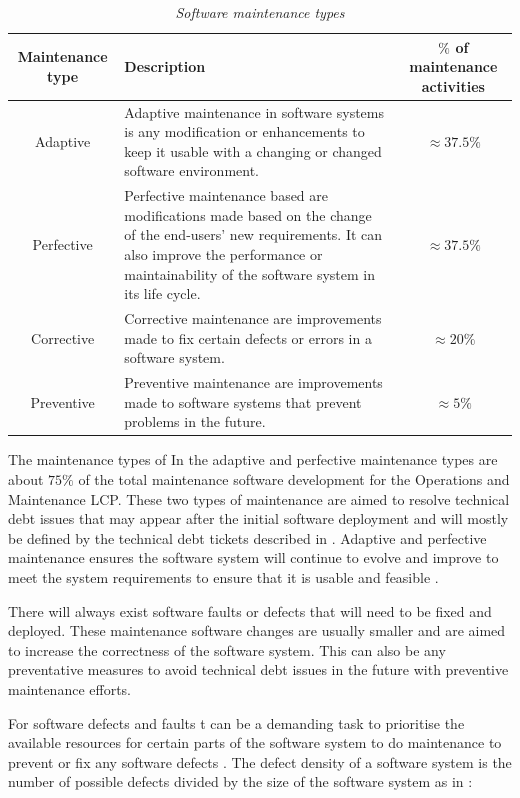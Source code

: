 \begin{table}[!htb]
	\centering
	\caption[Software maintenance types]
	{\textit{Software maintenance types \cite{Ping2010,Hasan2012}}}
	\label{tbl:ch1_maintenanceTypes}
	\begin{tabularx}{\textwidth}{|c|X|c|}
		\hline
		\textbf{Maintenance type} & \textbf{Description} & \textbf{$\%$ of maintenance activities} \\ \hline
		Adaptive & \raggedright Adaptive maintenance in software systems is any modification or enhancements to keep it usable with a changing or changed software environment. & $\approx 37.5\%$ \\ \hline
		Perfective & \raggedright Perfective maintenance based are modifications made based on the change of the end-users' new requirements. It can also improve the performance or maintainability of the software system in its life cycle. & $\approx 37.5\%$ \\ \hline
		Corrective & \raggedright Corrective maintenance are improvements made to fix certain defects or errors in a software system. & $\approx 20\%$ \\ \hline
		Preventive & \raggedright  Preventive maintenance are improvements made to software systems that prevent problems in the future. & $\approx 5\%$ \\ \hline
	\end{tabularx}
\end{table}

The maintenance types of  
In  the adaptive and perfective maintenance types are about $75\%$ of the total maintenance software development for the Operations and Maintenance LCP. These two types of maintenance are aimed to resolve technical debt issues that may appear after the initial software deployment and will mostly be defined by the technical debt tickets described in . Adaptive and perfective maintenance ensures the software system will continue to evolve and improve to meet the system requirements to ensure that it is usable and feasible \cite{Kumar2013}. \par There will always exist software faults or defects that will need to be fixed and deployed. These maintenance software changes are usually smaller and are aimed to increase the correctness of the software system. This can also be any preventative measures to avoid technical debt issues in the future with preventive maintenance efforts.\par For software defects and faults t can be a demanding task to prioritise the available resources for certain parts of the software system to do maintenance to prevent or fix any software defects \cite{Mamone1994, Hasan2012}.  The defect density of a software system is the number of possible defects divided by the size of the software system as in :

